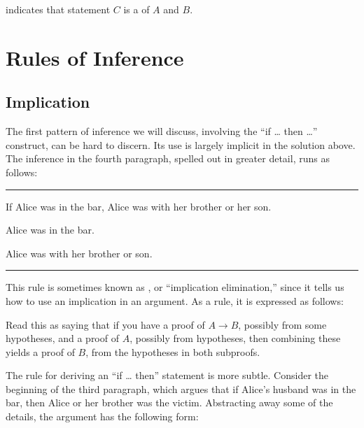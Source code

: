 \documentclass[letterpaper,10pt,english]{sphinxmanual}
\begin{document}
\begin{center}
\DP
\end{center}

\sphinxAtStartPar
indicates that statement \(C\) is a  of \(A\) and \(B\).


\section{Rules of Inference}
\label{\detokenize{propositional_logic:rules-of-inference}}

\subsection{Implication}
\label{\detokenize{propositional_logic:implication}}
\sphinxAtStartPar
The first pattern of inference we will discuss, involving the “if … then …” construct, can be hard to discern. Its use is largely implicit in the solution above. The inference in the fourth paragraph, spelled out in greater detail, runs as follows:


\bigskip\hrule\bigskip


\sphinxAtStartPar
If Alice was in the bar, Alice was with her brother or her son.

\sphinxAtStartPar
Alice was in the bar.

\sphinxAtStartPar
Alice was with her brother or son.


\bigskip\hrule\bigskip


\sphinxAtStartPar
This rule is sometimes known as , or “implication elimination,” since it tells us how to use an implication in an argument. As a rule, it is expressed as follows:



\begin{center}
\DP
\end{center}

\sphinxAtStartPar
Read this as saying that if you have a proof of \(A \to B\), possibly from some hypotheses, and a proof of \(A\), possibly from hypotheses, then combining these yields a proof of \(B\), from the hypotheses in both subproofs.

\sphinxAtStartPar
The rule for deriving an “if … then” statement is more subtle. Consider the beginning of the third paragraph, which argues that if Alice’s husband was in the bar, then Alice or her brother was the victim. Abstracting away some of the details, the argument has the following form:
\end{document}

